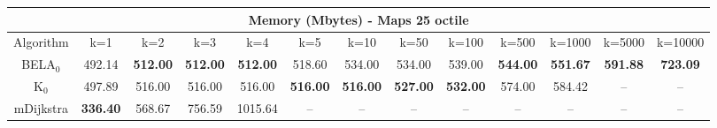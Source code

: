 \begin{tabular}{c|cccccccccccc}\toprule
\multicolumn{13}{c}{Memory (Mbytes) - Maps 25 octile}\\ \midrule
Algorithm & k=1 & k=2 & k=3 & k=4 & k=5 & k=10 & k=50 & k=100 & k=500 & k=1000 & k=5000 & k=10000 \\ \midrule
BELA$_0$ & 492.14 & \textbf{512.00} & \textbf{512.00} & \textbf{512.00} & 518.60 & 534.00 & 534.00 & 539.00 & \textbf{544.00} & \textbf{551.67} & \textbf{591.88} & \textbf{723.09} \\
K$_0$ & 497.89 & 516.00 & 516.00 & 516.00 & \textbf{516.00} & \textbf{516.00} & \textbf{527.00} & \textbf{532.00} & 574.00 & 584.42 & -- & -- \\
mDijkstra & \textbf{336.40} & 568.67 & 756.59 & 1015.64 & -- & -- & -- & -- & -- & -- & -- & -- \\ \bottomrule 
\end{tabular}
